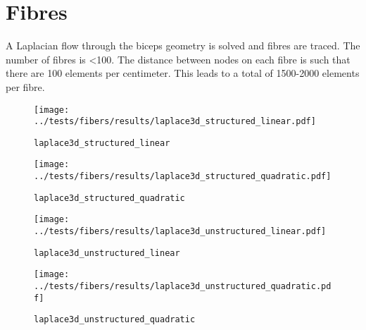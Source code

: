 %
\clearpage
%
%
\section{Fibres}
%
A Laplacian flow through the biceps geometry is solved and fibres are traced. The number of fibres is <100.
The distance between nodes on each fibre is such that there are 100 elements per centimeter. This leads to a total of 1500-2000 elements per fibre.


\begin{figure}[h!]
  \centering%
  \texttt{[image: ../tests/fibers/results/laplace3d\_structured\_linear.pdf]}
  \caption{\lstinline{laplace3d_structured_linear}}
\end{figure} 
%

%
\begin{figure}[h!]
  \centering%
  \texttt{[image: ../tests/fibers/results/laplace3d\_structured\_quadratic.pdf]}
  \caption{\lstinline{laplace3d_structured_quadratic}}
\end{figure} 
%

%
\begin{figure}[h!]
  \centering%
  \texttt{[image: ../tests/fibers/results/laplace3d\_unstructured\_linear.pdf]}
  \caption{\lstinline{laplace3d_unstructured_linear}}
\end{figure} 
%

%
\begin{figure}[h!]
  \centering%
  \texttt{[image: ../tests/fibers/results/laplace3d\_unstructured\_quadratic.pdf]}
  \caption{\lstinline{laplace3d_unstructured_quadratic}}
\end{figure} 
%



